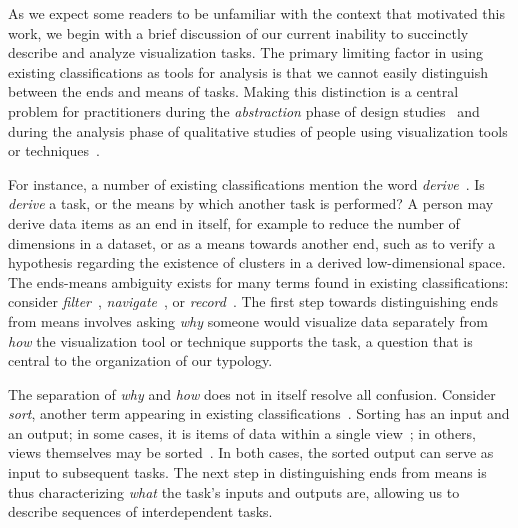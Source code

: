 As we expect some readers to be unfamiliar with the context that motivated this work, we begin with a brief discussion of our current inability to succinctly describe and analyze visualization tasks.
The primary limiting factor in using existing classifications as tools for analysis is that we cannot easily distinguish between the ends and means of tasks.
Making this distinction is a central problem for practitioners during the {\it abstraction} phase of design studies~\cite{Sedlmair2012} and during the analysis phase of qualitative studies of people using visualization tools or techniques~\cite{Lam2012}.

For instance, a number of existing classifications mention the word {\it derive}~\cite{Amar2005,Chuah1996,Heer2012,Lee2006,Pike2009,Springmeyer1992}.
Is {\it derive} a task, or the means by which another task is performed?
A person may derive data items as an end in itself, for example to reduce the number of dimensions in a dataset, or as a means towards another end, such as to verify a hypothesis regarding the existence of clusters in a derived low-dimensional space.
The ends-means ambiguity exists for many terms found in existing classifications: consider {\it filter}~\cite{Amar2005,Card1999,Gotz2008,Heer2012,Keim2002,Klein2006,Lee2006,Mullins1993,Pike2009,Pirolli2005,Roth2012,Roth2013,Shneiderman1996,Yi2007}, {\it navigate}~\cite{Heer2012,Spence2007,Ward2004}, or {\it record}~\cite{Heer2012,Mullins1993,Springmeyer1992}.
The first step towards distinguishing ends from means involves asking {\it why} someone would visualize data separately from {\it how} the visualization tool or technique supports the task, a question that is central to the organization of our typology.

The separation of {\it why} and {\it how} does not in itself resolve all confusion.
Consider {\it sort}, another term appearing in existing classifications~\cite{Amar2005,Gotz2008,Heer2012,Lee2006,Pike2009}.
Sorting has an input and an output; in some cases, it is items of data within a single view~\cite{Rao1994}; in others, views themselves may be sorted~\cite{Becker1996}.
In both cases, the sorted output can serve as input to subsequent tasks.
The next step in distinguishing ends from means is thus characterizing {\it what} the task's inputs and outputs are, allowing us to describe sequences of interdependent tasks.

